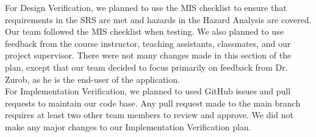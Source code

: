 \documentclass[12pt, titlepage]{article}
\begin{document}
\indent  For Design Verification, we planned to use the MIS checklist to ensure that requirements in the SRS are met and hazards in the Hazard Analysis are covered. Our team followed the MIS checklist when testing. We also planned to use feedback from the course instructor, teaching assistants, classmates, and our project supervisor. There were not many changes made in this section of the plan, except that our team decided to focus primarily on feedback from Dr. Zurob, as he is the end-user of the application. \\

\indent For Implementation Verification, we planned to used GitHub issues and pull requests to maintain our code base. Any pull request made to the main branch requires at least two other team members to review and approve. We did not make any major changes to our Implementation Verification plan. 
\end{document}
